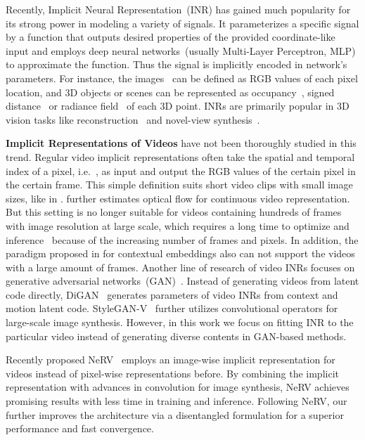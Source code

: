\documentclass[runningheads]{llncs}
\begin{document}
Recently, Implicit Neural Representation~(INR) has gained much popularity for its strong power in modeling a variety of signals. It parameterizes a specific signal by a function that outputs desired properties of the provided coordinate-like input and employs deep neural networks~(usually Multi-Layer Perceptron, MLP) to approximate the function. Thus the signal is implicitly encoded in network's parameters. For instance, the images~\cite{chen2021learning,mehta2021modulated,sitzmann2020implicit} can be defined as RGB values of each pixel location, and 3D objects or scenes can be represented as occupancy~\cite{mescheder2019occupancy,peng2020convolutional}, signed distance~\cite{park2019deepsdf} or radiance field~\cite{mildenhall2020nerf} of each 3D point. INRs are primarily popular in 3D vision tasks like reconstruction~\cite{littwin2019deep,niemeyer2020differentiable,wang2021neus,park2021nerfies,pumarola2021d,li2021neural,xian2021space} and novel-view synthesis~\cite{mildenhall2020nerf,yu2021pixelnerf,barron2021mip,yu2021plenoctrees,tancik2022block}.

\textbf{Implicit Representations of Videos} have not been thoroughly studied in this trend. Regular video implicit representations often take the spatial and temporal index of a pixel, i.e.\ , as input and output the RGB values of the certain pixel in the certain frame. This simple definition suits short video clips with small image sizes, like  in \cite{sitzmann2020implicit,mehta2021modulated}.\cite{rho2022neural} further estimates optical flow for continuous video representation. But this setting is no longer suitable for videos containing hundreds of frames with image resolution at large scale, which requires a long time to optimize and inference~\cite{chen2021nerv} because of the increasing number of frames and pixels. In addition, the paradigm proposed in \cite{mehta2021modulated} for contextual embeddings also can not support the videos with a large amount of frames. Another line of research of video INRs focuses on generative adversarial networks~(GAN)~\cite{goodfellow2014generative}. Instead of generating videos from latent code directly, DiGAN~\cite{yu2021generating} generates parameters of video INRs from context and motion latent code. StyleGAN-V~\cite{skorokhodov2021stylegan} further utilizes convolutional operators for large-scale image synthesis. However, in this work we focus on fitting INR to the particular video instead of generating diverse contents in GAN-based methods.

Recently proposed NeRV~\cite{chen2021nerv} employs an image-wise implicit representation for videos instead of pixel-wise representations before. By combining the implicit representation with advances in convolution for image synthesis, NeRV achieves promising results with less time in training and inference. Following NeRV, our \netname further improves the architecture via a disentangled formulation for a superior performance and fast convergence.
\end{document}
